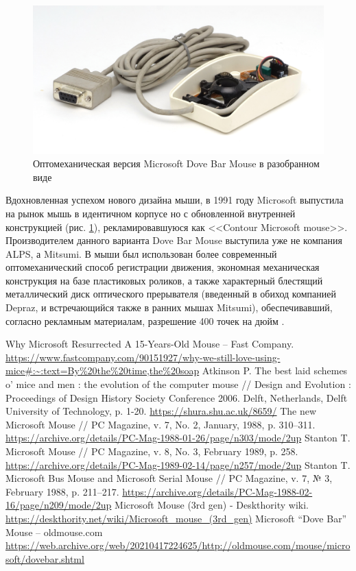 \documentclass[11pt, a4paper]{article}
\begin{document}
\begin{figure}[h]
    \centering
    \includegraphics[scale=0.6]{1987_microsoft_dove_bar_mouse/inside2_60.jpg}
    \caption{Оптомеханическая версия Microsoft Dove Bar Mouse в разобранном виде}
    \label{fig:MicrosoftDoveBarInside2}
\end{figure}

Вдохновленная успехом нового дизайна мыши,  в 1991 году Microsoft выпустила на рынок мышь в идентичном корпусе но с обновленной внутренней конструкцией (рис. \ref{fig:MicrosoftDoveBarInside2}), рекламировавшуюся как <<Contour Microsoft mouse>>. Производителем данного варианта Dove Bar Mouse выступила уже не компания ALPS, а Mitsumi. В мыши был использован более современный оптомеханический способ регистрации движения, экономная механическая конструкция на базе пластиковых роликов, а также характерный блестящий металлический диск оптического прерывателя (введенный в обиход компанией Depraz, и встречающийся также в ранних мышах Mitsumi), обеспечивавший, согласно рекламным материалам, разрешение 400 точек на дюйм \cite{doveBarMouseOldMouses}.

\begin{thebibliography}{9}
 Why Microsoft Resurrected A 15-Years-Old Mouse -- Fast Company. \url{https://www.fastcompany.com/90151927/why-we-still-love-using-mice#:~:text=By%20the%20time,the%20soap}
 Atkinson P. The best laid schemes o’ mice and men : the evolution of the computer mouse // Design and Evolution : Proceedings of Design History Society Conference 2006. Delft, Netherlands, Delft University of Technology, p. 1-20. \url{https://shura.shu.ac.uk/8659/}
 The new Microsoft Mouse // PC Magazine, v. 7, No. 2, January, 1988, p. 310--311. \url{https://archive.org/details/PC-Mag-1988-01-26/page/n303/mode/2up}
 Stanton T. Microsoft Mouse // PC Magazine, v. 8, No. 3, February 1989, p. 258. \url{https://archive.org/details/PC-Mag-1989-02-14/page/n257/mode/2up}
 Stanton T. Microsoft Bus Mouse and Microsoft Serial Mouse // PC Magazine, v. 7, № 3, February 1988, p. 211--217. \url{https://archive.org/details/PC-Mag-1988-02-16/page/n209/mode/2up}
 Microsoft Mouse (3rd gen) - Deskthority wiki. \url{https://deskthority.net/wiki/Microsoft_mouse_(3rd_gen)}
 Microsoft ``Dove Bar'' Mouse  -- oldmouse.com  \url{https://web.archive.org/web/20210417224625/http://oldmouse.com/mouse/microsoft/dovebar.shtml}
\end{thebibliography}
\end{document}
